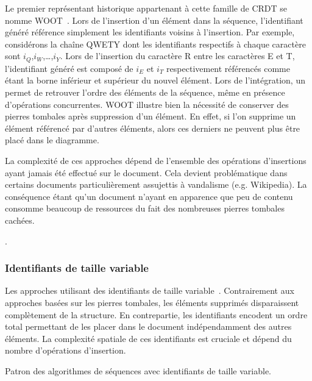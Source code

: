 Le premier représentant historique appartenant à cette famille de CRDT se nomme
WOOT~\cite{oster2006data}. Lors de l'insertion d'un élément dans la séquence,
l'identifiant généré référence simplement les identifiants voisins à
l'insertion. Par exemple, considérons la chaîne QWETY dont les identifiants
respectifs à chaque caractère sont $i_Q$,$i_W$,\ldots,$i_Y$. Lors de l'insertion
du caractère R entre les caractères E et T, l'identifiant généré est composé de
$i_E$ et $i_T$ respectivement référencés comme étant la borne inférieur et
supérieur du nouvel élément. Lors de l'intégration, un 
permet de retrouver l'ordre des éléments de la séquence, même en présence
d'opérations concurrentes. WOOT illustre bien la nécessité de conserver des
pierres tombales après suppression d'un élément. En effet, si l'on supprime un
élément référencé par d'autres éléments, alors ces derniers ne peuvent plus être
placé dans le diagramme.

La complexité de ces approches dépend de l'ensemble des opérations d'insertions
ayant jamais été effectué sur le document. Cela devient problématique dans
certains documents particulièrement assujettis à vandalisme (e.g. Wikipedia). La
conséquence étant qu'un document n'ayant en apparence que peu de contenu
consomme beaucoup de ressources du fait des nombreuses pierres tombales cachées.

.

\subsubsection{Identifiants de taille variable}

Les approches utilisant des identifiants de taille
variable~\cite{preguica2009commutative, andre2013supporting,
  weiss2009logoot}. Contrairement aux approches basées sur les pierres tombales,
les éléments supprimés disparaissent complètement de la structure. En
contrepartie, les identifiants encodent un ordre total permettant de les placer
dans le document indépendamment des autres éléments. La complexité spatiale de
ces identifiants est cruciale et dépend du nombre d'opérations d'insertion.

\begin{algorithm}
  
  \caption{\label{algo:crdtabstract} Patron des algorithmes de séquences avec
    identifiants de taille variable.}
\end{algorithm}

